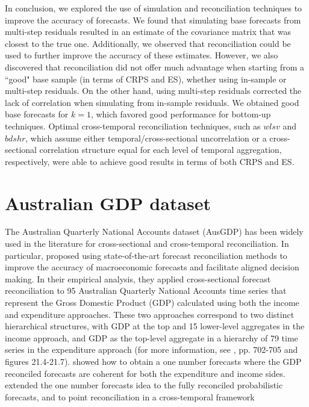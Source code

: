 \documentclass[a4paper,11pt]{article}
\theoremstyle{definition}
\begin{document}
In conclusion, we explored the use of simulation and reconciliation techniques to improve the accuracy of forecasts. We found that simulating base forecasts from multi-step residuals resulted in an estimate of the covariance matrix that was closest to the true one. Additionally, we observed that reconciliation could be used to further improve the accuracy of these estimates. However, we also discovered that reconciliation did not offer much advantage when starting from a “good" base sample (in terms of CRPS and ES), whether using in-sample or multi-step residuals. On the other hand, using multi-step residuals corrected the lack of correlation when simulating from in-sample residuals. We obtained good base forecasts for $k=1$, which favored good performance for bottom-up techniques. Optimal cross-temporal reconciliation techniques, such as $wlsv$ and $bdshr$, which assume either temporal/cross-sectional uncorrelation or a cross-sectional correlation structure equal for each level of temporal aggregation, respectively, were able to achieve good results in terms of both CRPS and ES. 

\section{Australian GDP dataset}\label{sec:ausgdp}

The Australian Quarterly National Accounts dataset (AusGDP) has been widely used in the literature for cross-sectional and cross-temporal reconciliation. In particular, \cite{athanasopoulos2020} proposed using state-of-the-art forecast reconciliation methods to improve the accuracy of macroeconomic forecasts and facilitate aligned decision making. In their empirical analysis, they applied cross-sectional forecast reconciliation to 95 Australian Quarterly National Accounts time series that represent the Gross Domestic Product (GDP) calculated using both the income and expenditure approaches. These two approaches correspond to two distinct hierarchical structures, with GDP at the top and 15 lower-level aggregates in the income approach, and GDP as the top-level aggregate in a hierarchy of 79 time series in the expenditure approach (for more information, see \citealp{athanasopoulos2020}, pp. 702-705 and figures 21.4-21.7). 
\cite{bisaglia2020} showed how to obtain a one number forecasts where the GDP reconciled forecasts are coherent for both the expenditure and income sides.
 \cite{giro2022, difonzo2022c} extended the one number forecasts idea to the fully reconciled probabilistic forecasts, and \cite{difonzo2023} to point reconciliation in a cross-temporal framework
\end{document}
